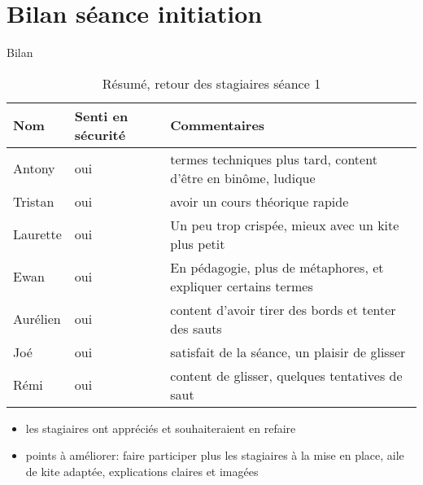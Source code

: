 \documentclass[10pt,a4paper]{beamer}
\begin{document}
\section{Bilan séance initiation}
\begin{frame}{Bilan}
\begin{table}
\begin{tabular}{|p{1cm}|p{2cm}|p{6cm}|}
        \hline
        \textbf{Nom} & \textbf{Senti en sécurité} & \textbf{Commentaires} \\ 
        \hline
       Antony      &  oui    &   termes techniques plus tard, content d’être en binôme, ludique         \\
       \hline
       Tristan     &  oui    & avoir un cours théorique rapide  \\
       \hline
        Laurette   &  oui    & Un peu trop crispée, mieux avec un kite plus petit \\
        \hline
        Ewan       &  oui    & En pédagogie, plus de métaphores, et expliquer certains termes\\
        \hline
        Aurélien   & oui     & content d'avoir tirer des bords et tenter des sauts  \\
        \hline
        Joé        & oui    &  satisfait de la séance, un plaisir de glisser \\
        \hline
        Rémi       & oui    & content de glisser, quelques tentatives de saut \\
        \hline  
\end{tabular}
\caption{Résumé, retour des stagiaires séance 1}
\end{table}
\begin{itemize}
\item les stagiaires ont appréciés et souhaiteraient en refaire
\item points à améliorer: faire participer plus les stagiaires à la mise en place, 
aile de kite adaptée, explications claires et imagées
\end{itemize}
\end{frame}
\end{document}
